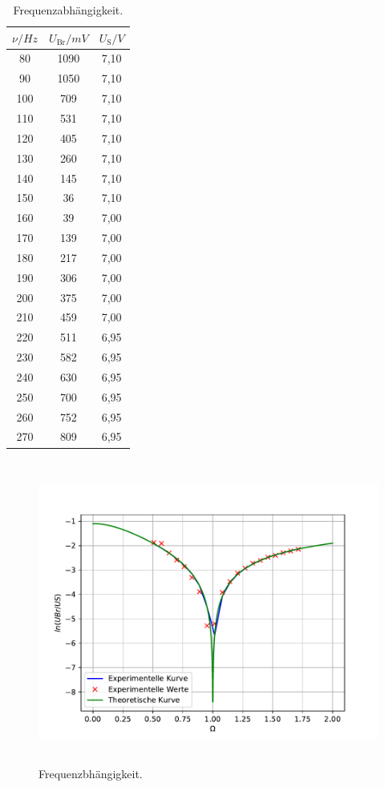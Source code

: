 \begin{table}[h!]
    \begin{center}
      \caption{Frequenzabhängigkeit.}
      \label{tab:Tabelle 4}
      \begin{tabular}{c|c|c} 
        \textbf{$\nu / Hz$ } & \textbf{$U_\text{Br} / mV$} & \textbf{$U_\text{S} / V$}\\
        \hline
        80 & 1090 & 7,10\\
        90 & 1050 & 7,10\\
        100 & 709 & 7,10\\
        110 & 531 & 7,10\\
        120 & 405 & 7,10\\
        130 & 260 & 7,10\\
        140 & 145 & 7,10\\
        150 & 36 & 7,10\\
        160 & 39 & 7,00\\
        170 & 139 & 7,00\\
        180 & 217 & 7,00\\
        190 & 306 & 7,00\\
        200 & 375 & 7,00\\
        210 & 459 & 7,00\\
        220 & 511 & 6,95\\
        230 & 582 & 6,95\\
        240 & 630 & 6,95\\
        250 & 700 & 6,95\\
        260 & 752 & 6,95\\
        270 & 809 & 6,95\\
      \end{tabular}
    \end{center}
\end{table}

\begin{figure}[H]
  \centering
  \includegraphics[height=10cm]{Auswertung/Frequenz_neu.pdf}
  \caption{Frequenzbhängigkeit.}
  \label{fig:Frequenz}
\end{figure}

